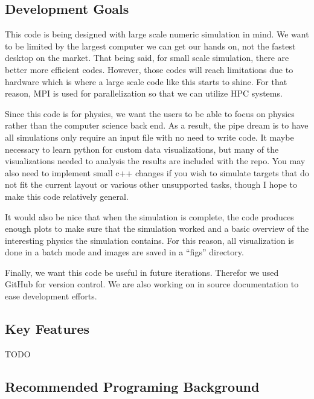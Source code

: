 \documentclass{article}
\begin{document}
\subsection{Development Goals} %
\label{sub:development_goals}
This code is being designed with large scale numeric simulation in mind. We want to be limited by the largest computer we can get our hands on, not the fastest desktop on the market. That being said, for small scale simulation, there are better more efficient codes. However, those codes will reach limitations due to hardware which is where a large scale code like this starts to shine. For that reason, MPI is used for parallelization so that we can utilize HPC systems.

Since this code is for physics, we want the users to be able to focus on physics rather than the computer science back end. As a result, the pipe dream is to have all simulations only require an input file with no need to write code. It maybe necessary to learn python for custom data visualizations, but many of the visualizations needed to analysis the results are included with the repo. You may also need to implement small c++ changes if you wish to simulate targets that do not fit the current layout or various other unsupported tasks, though I hope to make this code relatively general.

It would also be nice that when the simulation is complete, the code produces enough plots to make sure that the simulation worked and a basic overview of the interesting physics the simulation contains. For this reason, all visualization is done in a batch mode and images are saved in a ``figs'' directory.

Finally, we want this code be useful in future iterations. Therefor we used GitHub for version control. We are also working on in source documentation to ease development efforts.

\subsection{Key Features} %
\label{sub:key_features}
TODO

\subsection{Recommended Programing Background} %
\label{sub:recommended_programing_background}

\end{document}
